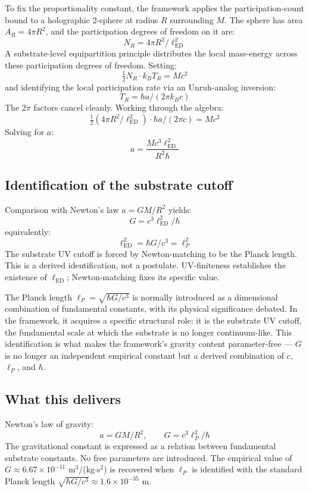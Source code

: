 \documentclass[11pt,a4paper]{article}
\begin{document}
To fix the proportionality constant, the framework applies the participation-count bound to a holographic 2-sphere at radius $R$ surrounding $M$. The sphere has area $A_R = 4\pi R^2$, and the participation degrees of freedom on it are:
\[
N_R = 4\pi R^{2} / \ell_{\mathrm{ED}}^{2}
\]
A substrate-level equipartition principle distributes the local mass-energy across these participation degrees of freedom. Setting:
\[
\tfrac{1}{2} N_R \cdot k_B T_R = Mc^{2}
\]
and identifying the local participation rate via an Unruh-analog inversion:
\[
T_R = \hbar a / (2\pi k_B c)
\]
The $2\pi$ factors cancel cleanly. Working through the algebra:
\[
\tfrac{1}{2}\left(4\pi R^{2} / \ell_{\mathrm{ED}}^{2}\right) \cdot \hbar a/(2\pi c) = Mc^{2}
\]
Solving for $a$:
\[
a = \frac{M c^{3} \ell_{\mathrm{ED}}^{2}}{R^{2} \hbar}
\]

\subsection{Identification of the substrate cutoff}

Comparison with Newton's law $a = GM/R^2$ yields:
\[
G = c^{3} \ell_{\mathrm{ED}}^{2} / \hbar
\]
equivalently:
\[
\ell_{\mathrm{ED}}^{2} = \hbar G/c^{3} = \ell_P^{2}
\]
The substrate UV cutoff is forced by Newton-matching to be the Planck length. This is a derived identification, not a postulate. UV-finiteness establishes the existence of $\ell_{\mathrm{ED}}$; Newton-matching fixes its specific value.

The Planck length $\ell_P = \sqrt{\hbar G/c^3}$ is normally introduced as a dimensional combination of fundamental constants, with its physical significance debated. In the framework, it acquires a specific structural role: it is the substrate UV cutoff, the fundamental scale at which the substrate is no longer continuum-like. This identification is what makes the framework's gravity content parameter-free --- $G$ is no longer an independent empirical constant but a derived combination of $c$, $\ell_P$, and $\hbar$.

\subsection{What this delivers}

Newton's law of gravity:
\[
a = GM/R^{2}, \qquad G = c^{3} \ell_P^{2} / \hbar
\]
The gravitational constant is expressed as a relation between fundamental substrate constants. No free parameters are introduced. The empirical value of $G \approx 6.67 \times 10^{-11}$ m$^3$/(kg$\cdot$s$^2$) is recovered when $\ell_P$ is identified with the standard Planck length $\sqrt{\hbar G/c^3} \approx 1.6 \times 10^{-35}$ m.
\end{document}
